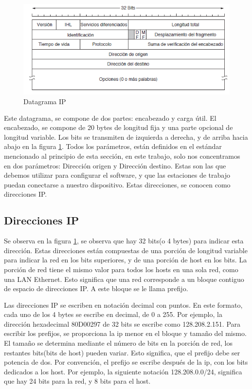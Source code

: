 \begin{figure}[ht]
	\centering
	\includegraphics{parte_2/redes/datagip}
	\caption{Datagrama IP}
	\label{fig:datIP}
\end{figure} 
Este datagrama, se compone de dos partes: encabezado y carga útil. El encabezado, se compone de 20 bytes de longitud fija y una parte opcional de longitud variable. Los bits se transmiten de izquierda a derecha, y de arriba hacia abajo en la figura \ref{fig:datIP}. Todos los parámetros, están definidos en el estándar mencionado al principio de esta sección, en este trabajo, solo nos concentramos en dos parámetros: Dirección origen y Dirección destino. Estas son las que debemos utilizar para configurar el software, y que las estaciones de trabajo puedan conectarse a nuestro dispositivo. Estas direcciones, se conocen como direcciones IP. 
\subsection{Direcciones IP} 
Se observa en la figura \ref{fig:datIP}, se observa que hay 32 bits(o 4 bytes) para indicar esta dirección. Estas direcciones están compuestas de una porción de longitud variable para indicar la red en los bits superiores, y de una porción de host en los bits. La porción de red tiene el mismo valor para todos los hosts en una sola red, como una LAN Ethernet. Esto significa que una red corresponde a un bloque contiguo de espacio de direcciones IP. A este bloque se le llama prefijo. 

Las direcciones IP se escriben en notación decimal con puntos. En este formato, cada uno de los 4 bytes se escribe en decimal, de 0 a 255. Por ejemplo, la dirección hexadecimal 80D00297 de 32 bits se escribe como 128.208.2.151. Para escribir los prefijos, se proporciona la ip menor en el bloque y tamaño del mismo. El tamaño se determina mediante el número de bits en la porción de red, los restantes bits(bits de host) pueden variar. Esto significa, que el prefijo debe ser potencia de dos. Por convención, el prefijo se escribe después de la ip, con los bits dedicados a los host. Por ejemplo, la siguiente notación 128.208.0.0/24, significa que hay 24 bits para la red, y 8 bits para el host. 

